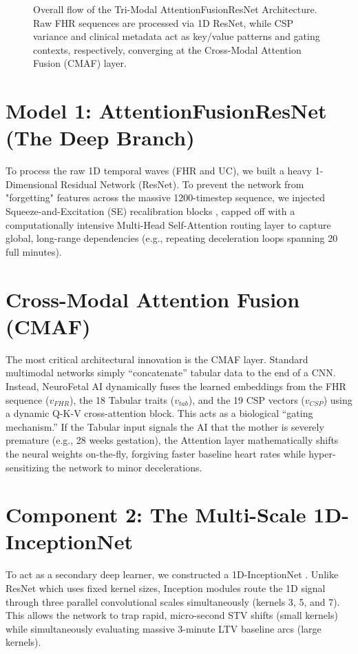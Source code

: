 \documentclass[12pt,a4paper]{report}
\begin{document}
\begin{figure}[H]
{\begin{tikzpicture}
\end{tikzpicture}
}
\caption{Overall flow of the Tri-Modal AttentionFusionResNet Architecture. Raw FHR sequences are processed via 1D ResNet, while CSP variance and clinical metadata act as key/value patterns and gating contexts, respectively, converging at the Cross-Modal Attention Fusion (CMAF) layer.}
\label{fig:arch}
\end{figure}

\section{Model 1: AttentionFusionResNet (The Deep Branch)}
To process the raw 1D temporal waves (FHR and UC), we built a heavy 1-Dimensional Residual Network (ResNet). To prevent the network from "forgetting" features across the massive 1200-timestep sequence, we injected Squeeze-and-Excitation (SE) recalibration blocks \cite{senet}, capped off with a computationally intensive Multi-Head Self-Attention routing layer to capture global, long-range dependencies (e.g., repeating deceleration loops spanning 20 full minutes).

\section{Cross-Modal Attention Fusion (CMAF)}
The most critical architectural innovation is the CMAF layer. Standard multimodal networks simply ``concatenate'' tabular data to the end of a CNN. Instead, NeuroFetal AI dynamically fuses the learned embeddings from the FHR sequence ($v_{FHR}$), the 18 Tabular traits ($v_{tab}$), and the 19 CSP vectors ($v_{CSP}$) using a dynamic Q-K-V cross-attention block. This acts as a biological ``gating mechanism.'' If the Tabular input signals the AI that the mother is severely premature (e.g., 28 weeks gestation), the Attention layer mathematically shifts the neural weights on-the-fly, forgiving faster baseline heart rates while hyper-sensitizing the network to minor decelerations.

\section{Component 2: The Multi-Scale 1D-InceptionNet}
To act as a secondary deep learner, we constructed a 1D-InceptionNet \cite{szegedy}. Unlike ResNet which uses fixed kernel sizes, Inception modules route the 1D signal through three parallel convolutional scales simultaneously (kernels 3, 5, and 7). This allows the network to trap rapid, micro-second STV shifts (small kernels) while simultaneously evaluating massive 3-minute LTV baseline arcs (large kernels).
\end{document}
